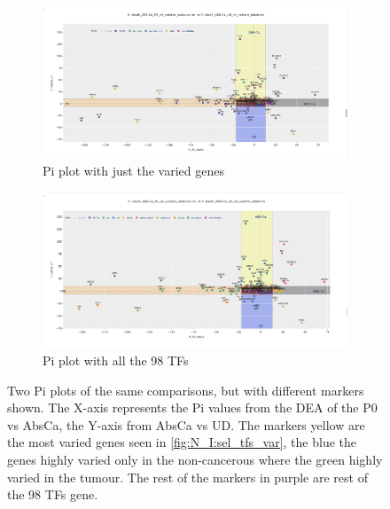 \begin{figure}[!h]
    \captionsetup[subfigure]{justification=Centering}
\begin{subfigure}[!t]{1.0\textwidth}
    \includegraphics[width=1.0\textwidth,height=1.0\textheight,keepaspectratio]{Sections/Network_I/Resources/selective_pruning/sel_tfs/sel_tfs_pi_all_var_rect.png}
    
    \caption{Pi plot with just the varied genes}
    
    \label{fig:N_I:pi_sel_tfs_var}
\end{subfigure}\hspace{\fill} %

\begin{subfigure}[!t]{1.0\textwidth}
    \includegraphics[width=1.0\textwidth,height=1.0\textheight,keepaspectratio]{Sections/Network_I/Resources/selective_pruning/sel_tfs/sel_tfs_pi_all_tissueDiff.png}
    
    \caption{Pi plot with all the 98 TFs}
    
    \label{fig:N_I:pi_sel_tfs_all}
\end{subfigure}\hspace{\fill} %

    \caption{Two Pi plots of the same comparisons, but with different markers shown. The X-axis represents the Pi values from the DEA of the P0 vs AbsCa, the Y-axis from AbsCa vs UD. The markers yellow are the most varied genes seen in \cref{fig:N_I:sel_tfs_var}, the blue the genes highly varied only in the non-cancerous where the green highly varied in the tumour. The rest of the markers in purple are rest of the 98 TFs gene.}
    
    \label{fig:N_I:pi_sel_tfs}
\end{figure}

